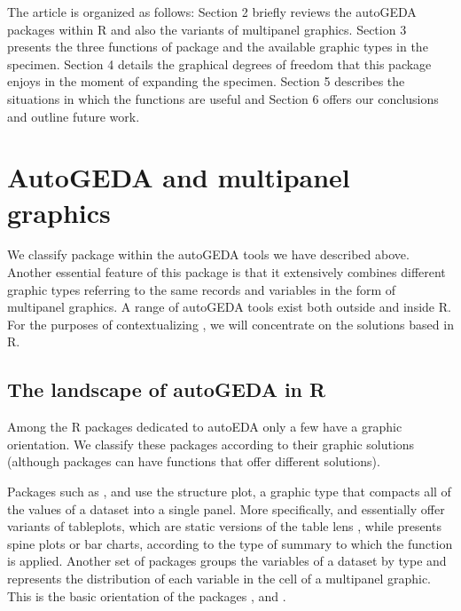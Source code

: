 The article is organized as follows: Section 2 briefly reviews the
autoGEDA packages within R and also the variants of
multipanel graphics. Section 3 presents the three functions of
 package and the available graphic types in the specimen.
Section 4 details the graphical degrees of freedom that this package
enjoys in the moment of expanding the specimen. Section 5 describes the
situations in which the functions are useful and Section 6 offers our
conclusions and outline future work.

\hypertarget{autogeda-and-multipanel-graphics}{%
	\section{AutoGEDA and multipanel
graphics}\label{autogeda-and-multipanel-graphics}}

We classify  package within the autoGEDA tools we have
described above. Another essential feature of this package is that it
extensively combines different graphic types referring to the same
records and variables in the form of multipanel graphics. A range of
autoGEDA tools exist both outside and inside R. For the
purposes of contextualizing , we will concentrate on the
solutions based in R.

\hypertarget{the-landscape-of-autogeda-in-r}{%
	\subsection{The landscape of autoGEDA in
R}\label{the-landscape-of-autogeda-in-r}}

Among the R packages dedicated to autoEDA \citep{Staniak2019}
only a few have a graphic orientation. We classify these packages
according to their graphic solutions (although packages can have
functions that offer different solutions).

Packages such as  \citep{Tennekes2013}, 
\citep{Tierney2017} and  \citep{Rushworth2019} use the
structure plot, a graphic type that compacts all of the values of a
dataset into a single panel. More specifically,  and
 essentially offer variants of tableplots, which are static
versions of the table lens \citep{Rao1994}, while 
presents spine plots or bar charts, according to the type of summary to
which the function  is applied. Another set of
packages groups the variables of a dataset by type and represents the
distribution of each variable in the cell of a multipanel graphic. This
is the basic orientation of the packages  \citep{Seibelt2017},
 \citep{Cui2019} and 
\citep{Ubrangala2019}.

